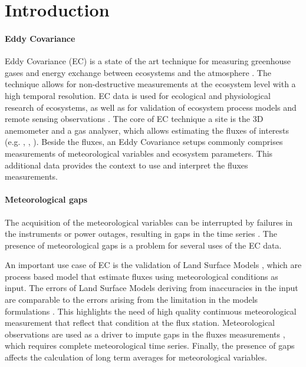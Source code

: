 \documentclass{article}
\let\Oldsection\section
\renewcommand{\section}{\FloatBarrier\Oldsection}
\let\Oldsubsection\subsection
\renewcommand{\subsection}{\FloatBarrier\Oldsubsection}
\begin{document}
\section{Introduction}


\paragraph{Eddy Covariance} Eddy Covariance (EC) is a state of the art technique for measuring greenhouse gases and energy exchange between ecosystems and the atmosphere \cite{aubinet_eddy_2012-1}.  The technique allows for non-destructive measurements at the ecosystem level with a high temporal resolution. EC data is used for ecological and physiological research of ecosystems, as well as for validation of ecosystem process models and remote sensing observations \cite{papale_ideas_2020}.
The core of EC technique a site is the 3D anemometer and a gas analyser, which allows estimating the fluxes of interests (e.g. , , ). Beside the fluxes, an Eddy Covariance setups commonly comprises measurements of meteorological variables and ecosystem parameters. This additional data provides the context to use and interpret the fluxes measurements.

\paragraph{Meteorological gaps} The acquisition of the meteorological variables can be interrupted by failures in the instruments or power outages, resulting in gaps in the time series \cite{aubinet_eddy_2012-1}.
The presence of meteorological gaps is a problem for several uses of the EC data.

An important use case of EC is the validation of Land Surface Models \cite{balzarolo_evaluating_2014, friend_fluxnet_2007-1, bonan_improving_2011-1, kramer_evaluation_2002}, which are process based model that estimate fluxes using meteorological conditions as input. The errors of Land Surface Models deriving from inaccuracies in the input are comparable to the errors arising from the limitation in the models formulations \cite{zhao_how_2012}. This highlights the need of high quality continuous meteorological measurement that reflect that condition at the flux station.
Meteorological observations are used as a driver to impute gaps in the fluxes measurements \cite{aubinet_eddy_2012-1}, which requires complete meteorological time series.
Finally, the presence of gaps affects the calculation of long term averages for meteorological variables. 
\end{document}
